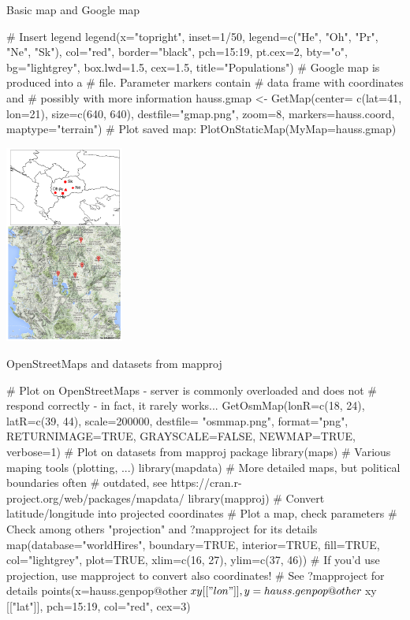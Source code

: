 \documentclass[compress, ucs, xelatex, 11pt, xcolor=svgnames,
  hyperref={
    bookmarks=true,
    unicode=true,
    colorlinks=true,
    pdftitle={Molecular data in R},
    plainpages=false,
    pdfauthor={Vojtech Zeisek},
    pdfsubject={Course about phylogeny and evolution in R},
    pdfcreator={XeLaTeX},
    pdfkeywords={R, evolution, phylogeny, molecular data},
    linkcolor=Tomato,
    anchorcolor=SaddleBrown,
    citecolor=Goldenrod,
    filecolor=DarkMagenta,
    menucolor=Sienna,
    urlcolor=DarkTurquoise,
    pdftex},
  url={hyphens, lowtilde} %
  ]{beamer}
\begin{document}
\begin{frame}[fragile]{Basic map and Google map}
\begin{multicols}{2}
  \begin{spluscode}
    # Insert legend
    legend(x="topright", inset=1/50,
      legend=c("He", "Oh", "Pr", "Ne",
      "Sk"), col="red", border="black",
      pch=15:19, pt.cex=2, bty="o",
      bg="lightgrey", box.lwd=1.5,
      cex=1.5, title="Populations")
    # Google map is produced into a
    # file. Parameter markers contain
    # data frame with coordinates and
    # possibly with more information
    hauss.gmap <- GetMap(center=
      c(lat=41, lon=21), size=c(640,
      640), destfile="gmap.png",
      zoom=8, markers=hauss.coord,
      maptype="terrain") # Plot saved map:
    PlotOnStaticMap(MyMap=hauss.gmap)
  \end{spluscode}
  \begin{center}
    \includegraphics[height=6.5cm]{maps.png}
  \end{center}
\end{multicols}
\end{frame}

\begin{frame}[fragile]{OpenStreetMaps and datasets from mapproj}
  \begin{spluscode}
    # Plot on OpenStreetMaps - server is commonly overloaded and does not
    # respond correctly - in fact, it rarely works...
    GetOsmMap(lonR=c(18, 24), latR=c(39, 44), scale=200000, destfile=
      "osmmap.png", format="png", RETURNIMAGE=TRUE, GRAYSCALE=FALSE,
      NEWMAP=TRUE, verbose=1)
    # Plot on datasets from mapproj package
    library(maps) # Various maping tools (plotting, ...)
    library(mapdata) # More detailed maps, but political boundaries often
           # outdated, see https://cran.r-project.org/web/packages/mapdata/
    library(mapproj) # Convert latitude/longitude into projected coordinates
    # Plot a map, check parameters
    # Check among others "projection" and ?mapproject for its details
    map(database="worldHires", boundary=TRUE, interior=TRUE, fill=TRUE,
      col="lightgrey", plot=TRUE, xlim=c(16, 27), ylim=c(37, 46))
    # If you'd use projection, use mapproject to convert also coordinates!
    # See ?mapproject for details
    points(x=hauss.genpop@other$xy[["lon"]], y=hauss.genpop@other$xy
      [["lat"]], pch=15:19, col="red", cex=3)
  \end{spluscode}
\end{frame}
\end{document}
